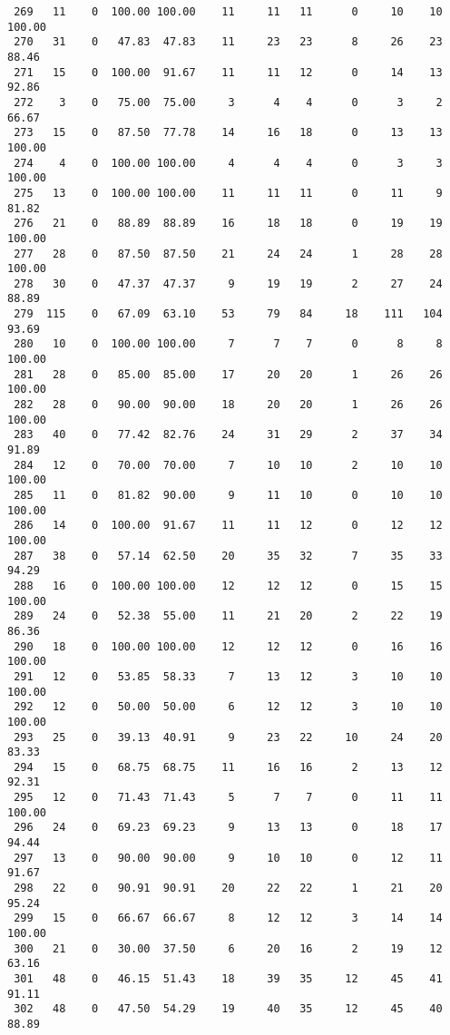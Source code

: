 \begin{verbatim}
 269   11    0  100.00 100.00    11     11   11      0     10    10   100.00
 270   31    0   47.83  47.83    11     23   23      8     26    23    88.46
 271   15    0  100.00  91.67    11     11   12      0     14    13    92.86
 272    3    0   75.00  75.00     3      4    4      0      3     2    66.67
 273   15    0   87.50  77.78    14     16   18      0     13    13   100.00
 274    4    0  100.00 100.00     4      4    4      0      3     3   100.00
 275   13    0  100.00 100.00    11     11   11      0     11     9    81.82
 276   21    0   88.89  88.89    16     18   18      0     19    19   100.00
 277   28    0   87.50  87.50    21     24   24      1     28    28   100.00
 278   30    0   47.37  47.37     9     19   19      2     27    24    88.89
 279  115    0   67.09  63.10    53     79   84     18    111   104    93.69
 280   10    0  100.00 100.00     7      7    7      0      8     8   100.00
 281   28    0   85.00  85.00    17     20   20      1     26    26   100.00
 282   28    0   90.00  90.00    18     20   20      1     26    26   100.00
 283   40    0   77.42  82.76    24     31   29      2     37    34    91.89
 284   12    0   70.00  70.00     7     10   10      2     10    10   100.00
 285   11    0   81.82  90.00     9     11   10      0     10    10   100.00
 286   14    0  100.00  91.67    11     11   12      0     12    12   100.00
 287   38    0   57.14  62.50    20     35   32      7     35    33    94.29
 288   16    0  100.00 100.00    12     12   12      0     15    15   100.00
 289   24    0   52.38  55.00    11     21   20      2     22    19    86.36
 290   18    0  100.00 100.00    12     12   12      0     16    16   100.00
 291   12    0   53.85  58.33     7     13   12      3     10    10   100.00
 292   12    0   50.00  50.00     6     12   12      3     10    10   100.00
 293   25    0   39.13  40.91     9     23   22     10     24    20    83.33
 294   15    0   68.75  68.75    11     16   16      2     13    12    92.31
 295   12    0   71.43  71.43     5      7    7      0     11    11   100.00
 296   24    0   69.23  69.23     9     13   13      0     18    17    94.44
 297   13    0   90.00  90.00     9     10   10      0     12    11    91.67
 298   22    0   90.91  90.91    20     22   22      1     21    20    95.24
 299   15    0   66.67  66.67     8     12   12      3     14    14   100.00
 300   21    0   30.00  37.50     6     20   16      2     19    12    63.16
 301   48    0   46.15  51.43    18     39   35     12     45    41    91.11
 302   48    0   47.50  54.29    19     40   35     12     45    40    88.89

\end{verbatim}

